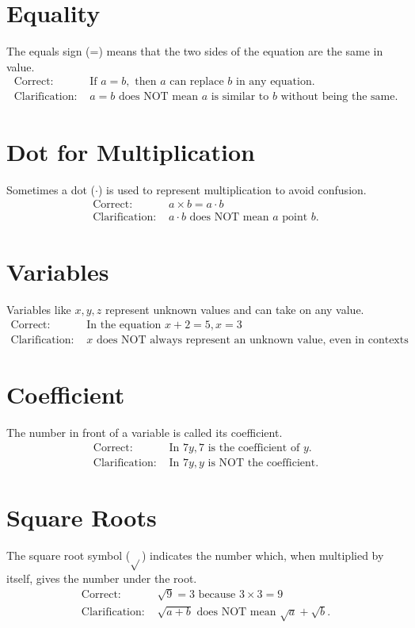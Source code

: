 \documentclass[12pt]{article}
\begin{document}
\section*{Equality}
The equals sign (=) means that the two sides of the equation are the same in value.
\begin{align*}
    \text{Correct: } & \text{If } a = b, \text{ then } a \text{ can replace } b \text{ in any equation.} \\
    \text{Clarification: } & a = b \text{ does NOT mean } a \text{ is similar to } b \text{ without being the same.}
\end{align*}

\section*{Dot for Multiplication}
Sometimes a dot ($\cdot$) is used to represent multiplication to avoid confusion.
\begin{align*}
    \text{Correct: } & a \times b = a \cdot b \\
    \text{Clarification: } & a \cdot b \text{ does NOT mean } a \text{ point } b.
\end{align*}

\section*{Variables}
Variables like \(x, y, z\) represent unknown values and can take on any value.
\begin{align*}
    \text{Correct: } & \text{In the equation } x + 2 = 5, x = 3 \\
    \text{Clarification: } & x \text{ does NOT always represent an unknown value, even in contexts where its value has been defined.}
\end{align*}

\section*{Coefficient}
The number in front of a variable is called its coefficient.
\begin{align*}
    \text{Correct: } & \text{In } 7y, 7 \text{ is the coefficient of } y. \\
    \text{Clarification: } & \text{In } 7y, y \text{ is NOT the coefficient.}
\end{align*}

\section*{Square Roots}
The square root symbol (\(\sqrt{} \)) indicates the number which, when multiplied by itself, gives the number under the root.
\begin{align*}
    \text{Correct: } & \sqrt{9} = 3 \text{ because } 3 \times 3 = 9 \\
    \text{Clarification: } & \sqrt{a + b} \text{ does NOT mean } \sqrt{a} + \sqrt{b}.
\end{align*}
\end{document}
